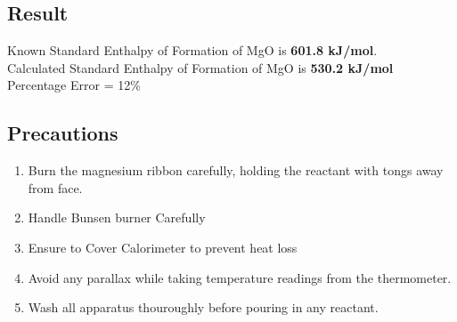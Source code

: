 \subsection{Result}
Known Standard Enthalpy of Formation of MgO is \textbf{601.8 kJ/mol}. \\
Calculated Standard Enthalpy of Formation of MgO is \textbf{530.2 kJ/mol} \\
Percentage Error = 12\%
\subsection{Precautions}
\begin{enumerate}
\item Burn the magnesium ribbon carefully, holding the reactant with tongs away from face.
  \cleardoublepage
\item Handle Bunsen burner Carefully
\item Ensure to Cover Calorimeter to prevent heat loss
\item Avoid any parallax while taking temperature readings from the thermometer.
  \item Wash all apparatus thouroughly before pouring in any reactant.
\end{enumerate}


                                                                           
